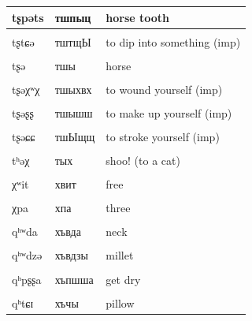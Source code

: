 \documentclass[
]{article}
\begin{document}
\begin{longtable}{l|l|l}
\hline
tʂpəts & тшпыц & horse tooth\\
\hline
\cellcolor{gray!6}{tʂɾədz} & \cellcolor{gray!6}{тшрыдз} & \cellcolor{gray!6}{to disappear (imp)}\\
\hline
tʂtɕə & тштщЫ & to dip into something (imp)\\
\hline
\cellcolor{gray!6}{tʂχʲæ} & \cellcolor{gray!6}{тшхьа} & \cellcolor{gray!6}{forage}\\
\hline
tʂə & тшы & horse\\
\hline
\cellcolor{gray!6}{tʂət} & \cellcolor{gray!6}{тшыт} & \cellcolor{gray!6}{piece}\\
\hline
tʂəχʷχ & тшыхвх & to wound yourself (imp)\\
\hline
\cellcolor{gray!6}{tʂəχʂ} & \cellcolor{gray!6}{тшыхш} & \cellcolor{gray!6}{koumiss}\\
\hline
tʂəʂʂ & тшышш & to make up yourself (imp)\\
\hline
\cellcolor{gray!6}{tʂəɕχ} & \cellcolor{gray!6}{тшыщх} & \cellcolor{gray!6}{to kill yourself (imp)}\\
\hline
tʂəɕɕ & тшЫщщ & to stroke yourself (imp)\\
\hline
\cellcolor{gray!6}{tʰəpʰ} & \cellcolor{gray!6}{тып} & \cellcolor{gray!6}{shelter of branches}\\
\hline
tʰəχ & тых & shoo! (to a cat)\\
\hline
\cellcolor{gray!6}{χʷba} & \cellcolor{gray!6}{хвба} & \cellcolor{gray!6}{five}\\
\hline
χʷit & хвит & free\\
\hline
\cellcolor{gray!6}{χzə} & \cellcolor{gray!6}{хзы} & \cellcolor{gray!6}{whey}\\
\hline
χpa & хпа & three\\
\hline
\cellcolor{gray!6}{χʂə} & \cellcolor{gray!6}{хшы} & \cellcolor{gray!6}{milk}\\
\hline
qʰʷda & хъвда & neck\\
\hline
\cellcolor{gray!6}{qʰʷdaʂ} & \cellcolor{gray!6}{хъвдаш} & \cellcolor{gray!6}{white neck (bird)}\\
\hline
qʰʷdzə & хъвдзы & millet\\
\hline
\cellcolor{gray!6}{qʰʷdzəts} & \cellcolor{gray!6}{хъвдзыц} & \cellcolor{gray!6}{grain}\\
\hline
qʰpʂʂa & хъпшша & get dry\\
\hline
\cellcolor{gray!6}{qʰtɕkʷpsa} & \cellcolor{gray!6}{хъчквпса} & \cellcolor{gray!6}{lace pillow cover}\\
\hline
qʰtɕɪ & хъчы & pillow\\

\end{longtable}
\end{document}
